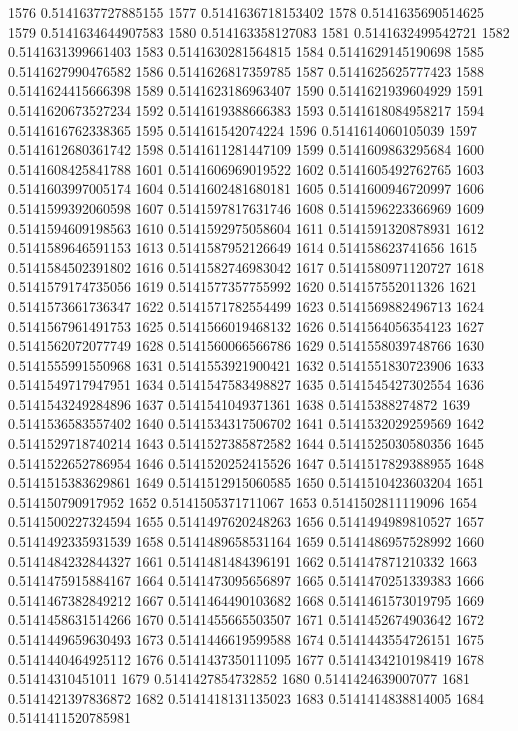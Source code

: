 1576 0.5141637727885155
1577 0.5141636718153402
1578 0.5141635690514625
1579 0.5141634644907583
1580 0.514163358127083
1581 0.5141632499542721
1582 0.5141631399661403
1583 0.5141630281564815
1584 0.5141629145190698
1585 0.5141627990476582
1586 0.5141626817359785
1587 0.5141625625777423
1588 0.5141624415666398
1589 0.5141623186963407
1590 0.5141621939604929
1591 0.5141620673527234
1592 0.5141619388666383
1593 0.5141618084958217
1594 0.5141616762338365
1595 0.514161542074224
1596 0.5141614060105039
1597 0.5141612680361742
1598 0.5141611281447109
1599 0.5141609863295684
1600 0.5141608425841788
1601 0.5141606969019522
1602 0.5141605492762765
1603 0.5141603997005174
1604 0.5141602481680181
1605 0.5141600946720997
1606 0.5141599392060598
1607 0.5141597817631746
1608 0.5141596223366969
1609 0.5141594609198563
1610 0.5141592975058604
1611 0.5141591320878931
1612 0.5141589646591153
1613 0.5141587952126649
1614 0.514158623741656
1615 0.5141584502391802
1616 0.5141582746983042
1617 0.5141580971120727
1618 0.5141579174735056
1619 0.5141577357755992
1620 0.514157552011326
1621 0.5141573661736347
1622 0.5141571782554499
1623 0.5141569882496713
1624 0.5141567961491753
1625 0.5141566019468132
1626 0.5141564056354123
1627 0.5141562072077749
1628 0.5141560066566786
1629 0.5141558039748766
1630 0.5141555991550968
1631 0.5141553921900421
1632 0.5141551830723906
1633 0.5141549717947951
1634 0.5141547583498827
1635 0.5141545427302554
1636 0.5141543249284896
1637 0.5141541049371361
1638 0.51415388274872
1639 0.5141536583557402
1640 0.5141534317506702
1641 0.5141532029259569
1642 0.5141529718740214
1643 0.5141527385872582
1644 0.5141525030580356
1645 0.5141522652786954
1646 0.5141520252415526
1647 0.5141517829388955
1648 0.5141515383629861
1649 0.5141512915060585
1650 0.5141510423603204
1651 0.514150790917952
1652 0.5141505371711067
1653 0.5141502811119096
1654 0.5141500227324594
1655 0.5141497620248263
1656 0.5141494989810527
1657 0.5141492335931539
1658 0.5141489658531164
1659 0.5141486957528992
1660 0.5141484232844327
1661 0.5141481484396191
1662 0.514147871210332
1663 0.5141475915884167
1664 0.5141473095656897
1665 0.5141470251339383
1666 0.5141467382849212
1667 0.5141464490103682
1668 0.5141461573019795
1669 0.5141458631514266
1670 0.5141455665503507
1671 0.5141452674903642
1672 0.5141449659630493
1673 0.5141446619599588
1674 0.5141443554726151
1675 0.5141440464925112
1676 0.5141437350111095
1677 0.5141434210198419
1678 0.51414310451011
1679 0.5141427854732852
1680 0.5141424639007077
1681 0.5141421397836872
1682 0.5141418131135023
1683 0.5141414838814005
1684 0.5141411520785981
